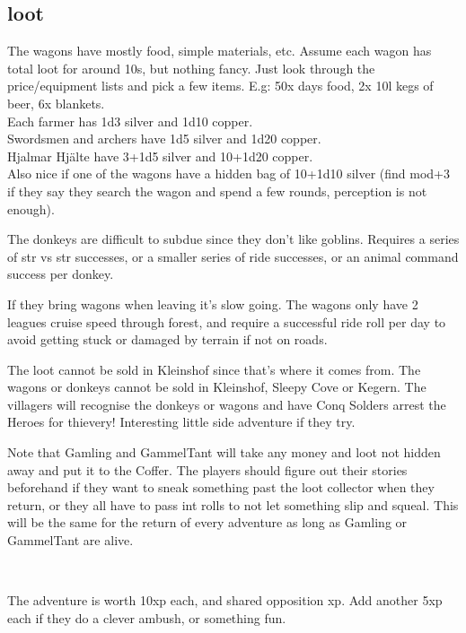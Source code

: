 \subsection*{loot}

The wagons have mostly food, simple materials, etc. Assume each wagon has total loot for around 10s, but nothing fancy. Just look through the price/equipment lists and pick a few items. E.g: 50x days food, 2x 10l kegs of beer, 6x blankets.\\
Each farmer has 1d3 silver and 1d10 copper.\\
Swordsmen and archers have 1d5 silver and 1d20 copper.\\
Hjalmar Hjälte have 3+1d5 silver and 10+1d20 copper.\\
Also nice if one of the wagons have a hidden bag of 10+1d10 silver (find mod+3 if they say they search the wagon and spend a few rounds, perception is not enough).

The donkeys are difficult to subdue since they don't like goblins. Requires a series of str vs str successes, or a smaller series of ride successes, or an animal command success per donkey. 

If they bring wagons when leaving it's slow going. The wagons only have 2 leagues cruise speed through forest, and require a successful ride roll per day to avoid getting stuck or damaged by terrain if not on roads.

The loot cannot be sold in Kleinshof since that's where it comes from. The wagons or donkeys cannot be sold in Kleinshof, Sleepy Cove or Kegern. The villagers will recognise the donkeys or wagons and have Conq Solders arrest the Heroes for thievery! Interesting little side adventure if they try.

Note that Gamling and GammelTant will take any money and loot not hidden away and put it to the Coffer. The players should figure out their stories beforehand if they want to sneak something past the loot collector when they return, or they all have to pass int rolls to not let something slip and squeal. This will be the same for the return of every adventure as long as Gamling or GammelTant are alive.

\

The adventure is worth 10xp each, and shared opposition xp. Add another 5xp each if they do a clever ambush, or something fun.











